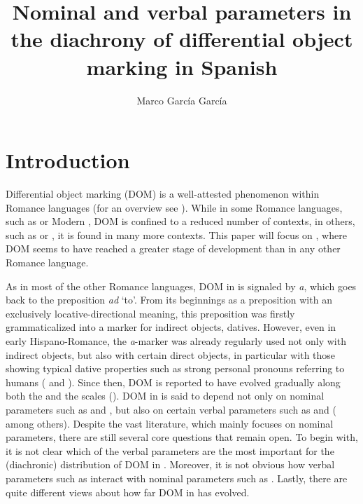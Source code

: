 \documentclass[output=paper]{LSP/langsci}
\author{Marco García García\affiliation{University of Cologne}}
\title{Nominal and verbal parameters in the diachrony of differential object marking in Spanish}
\begin{document}
\section{Introduction}
\label{08-sec:1}

Differential object marking (DOM) is a well-attested phenomenon within Romance languages (for an overview see \citealt[218--230]{Bossong1998Marquage}). While in some Romance languages, such as  or Modern , DOM is confined to a reduced number of contexts, in others, such as  or , it is found in many more contexts. This paper will focus on , where DOM seems to have reached a greater stage of development than in any other Romance language.

As in most of the other Romance languages, DOM in  is signaled by \textit{a}, which goes back to the  preposition \textit{ad} ‘to’. From its beginnings as a preposition with an exclusively locative-directional meaning, this preposition was firstly grammaticalized into a marker for indirect objects, \ie datives. However, even in early Hispano-Romance, the \textit{a}-marker was already regularly used not only with indirect objects, but also with certain direct objects, in particular with those showing typical dative properties such as strong personal pronouns referring to humans (\cf \citealt[184--185]{Pensado1995Creacion} and \citealt[205]{Company2002Grammaticalization}). Since then, DOM is reported to have evolved gradually along both the  and the  scales (\cf \eg \citealt[470--471]{Aissen2003Differential}). DOM in  is said to depend not only on nominal parameters such as  and , but also on certain verbal parameters such as  and  (\cf \citealt[1784--1791]{Torrego1999Gramatica} among others). Despite the vast literature, which mainly focuses on nominal parameters, there are still several core questions that remain open. To begin with, it is not clear which of the verbal parameters are the most important for the (diachronic) distribution of DOM in . Moreover, it is not obvious how verbal parameters such as  interact with nominal parameters such as . Lastly, there are quite different views about how far DOM in  has evolved.
\end{document}
